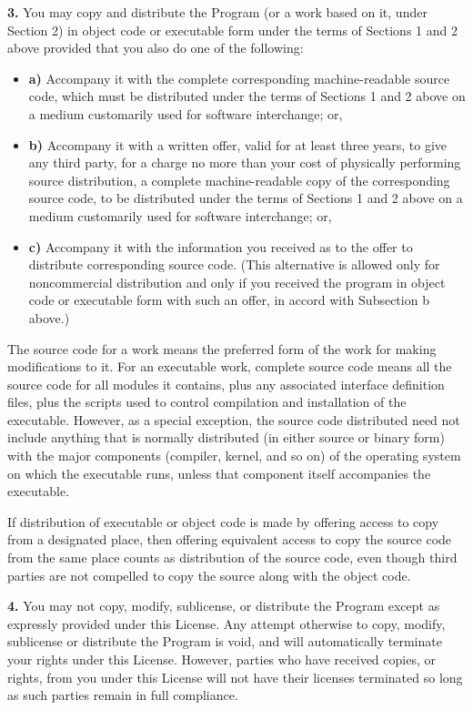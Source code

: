 {\bf 3.} You may copy and distribute the Program (or a work based on it, under
Section 2) in object code or executable form under the terms of Sections 1 and
2 above provided that you also do one of the following: 

\begin{itemize}
\item {\bf a)} Accompany it with the complete corresponding  machine-readable
   source code, which must be distributed under the terms of  Sections 1 and 2
   above on a medium customarily used for software interchange;  or,  

\item {\bf b)} Accompany it with a written offer, valid for at least  three
   years, to give any third party, for a charge no more than your cost of 
   physically performing source distribution, a complete machine-readable copy of
   the corresponding source code, to be distributed under the terms of Sections
   1  and 2 above on a medium customarily used for software interchange; or,  

\item {\bf c)} Accompany it with the information you received as to  the offer
   to distribute corresponding source code. (This alternative is  allowed only
   for noncommercial distribution and only if you received the  program in object
   code or executable form with such an offer, in accord with  Subsection b
   above.) 
\end{itemize}

The source code for a work means the preferred form of the work for making
modifications to it. For an executable work, complete source code means all
the source code for all modules it contains, plus any associated interface
definition files, plus the scripts used to control compilation and
installation of the executable. However, as a special exception, the source
code distributed need not include anything that is normally distributed (in
either source or binary form) with the major components (compiler, kernel, and
so on) of the operating system on which the executable runs, unless that
component itself accompanies the executable. 

If distribution of executable or object code is made by offering access to
copy from a designated place, then offering equivalent access to copy the
source code from the same place counts as distribution of the source code,
even though third parties are not compelled to copy the source along with the
object code. 

{\bf 4.} You may not copy, modify, sublicense, or distribute the Program
except as expressly provided under this License. Any attempt otherwise to
copy, modify, sublicense or distribute the Program is void, and will
automatically terminate your rights under this License. However, parties who
have received copies, or rights, from you under this License will not have
their licenses terminated so long as such parties remain in full compliance. 

